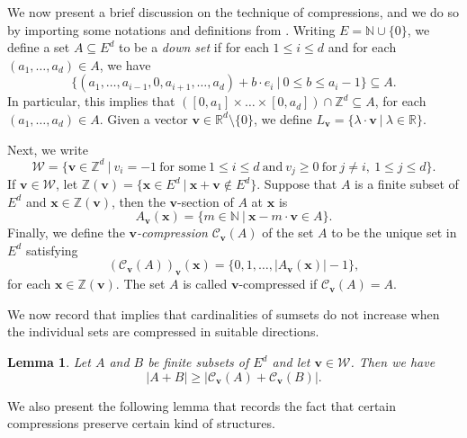 \documentclass[10pt]{article}
\renewcommand\vec{\bm}
\newtheorem{lemma}[theorem]{Lemma}
\numberwithin{equation}{section}
\begin{document}
We now present a brief discussion on the technique of compressions, and we do so by importing some notations and definitions from \cite{GG2001}. Writing $E = \mathbb{N} \cup \{0\}$, we define a set $A \subseteq E^d$ to be a \emph{down set} if for each $1 \leq i \leq d$ and for each $(a_1, \dots, a_d) \in A$, we have
\[ \{ (a_1, \dots, a_{i-1}, 0, a_{i+1}, \dots, a_d) + b \cdot e_i \ | \ 0 \leq b \leq a_i -1 \} \subseteq A. \]
In particular, this implies that $([0, a_1] \times \dots \times [0, a_d]) \cap \mathbb{Z}^d \subseteq A$, for each $(a_1, \dots, a_d) \in A$. Given a vector $\vec{v} \in \mathbb{R}^d \setminus \{0\}$, we define $L_{\vec{v}} = \{ \lambda \cdot \vec{v} \ | \ \lambda \in \mathbb{R} \}$.
\par

Next, we write 
\[ \mathcal{W} = \{ \vec{v} \in \mathbb{Z}^d \ | \ v_i = - 1 \ \text{for some} \ 1 \leq i \leq d \ \text{and} \ v_j \geq 0 \ \text{for} \ j \neq i, \ 1 \leq j \leq d \}. \]
If $\vec{v} \in \mathcal{W}$, let $\mathbb{Z}(\vec{v}) = \{ \vec{x} \in E^d \ | \ \vec{x} + \vec{v} \notin E^d \}$. Suppose that $A$ is a finite subset of $E^d$ and $\vec{x} \in \mathbb{Z}(\vec{v})$, then the $\vec{v}$-section of $A$ at $\vec{x}$ is 
\[ A_{\vec{v}}(\vec{x}) = \{ m \in \mathbb{N} \ | \ \vec{x} - m \cdot \vec{v} \in A\}. \]
Finally, we define the \emph{$\vec{v}$-compression} $\mathcal{C}_{\vec{v}}(A)$ of the set $A$ to be the unique set in $E^d$ satisfying
\[ (\mathcal{C}_{\vec{v}}(A))_{\vec{v}}(\vec{x}) = \{ 0, 1, \dots, |A_{\vec{v}}(\vec{x}) | - 1\}, \]
for each $\vec{x} \in \mathbb{Z}(\vec{v})$. The set $A$ is called $\vec{v}$-compressed if $\mathcal{C}_{\vec{v}}(A) = A$.
\par

We now record \cite[Corollary $3.5$]{GG2001} that implies that cardinalities of sumsets do not increase when the individual sets are compressed in suitable directions.

\begin{lemma} \label{gardc}
Let $A$ and $B$ be finite subsets of $E^d$ and let $\vec{v} \in \mathcal{W}$. Then we have
\[ |A+B| \geq |\mathcal{C}_{\vec{v}}(A) + \mathcal{C}_{\vec{v}}(B)|. \]
\end{lemma}


We also present the following lemma that records the fact that certain compressions preserve certain kind of structures.
\end{document}
